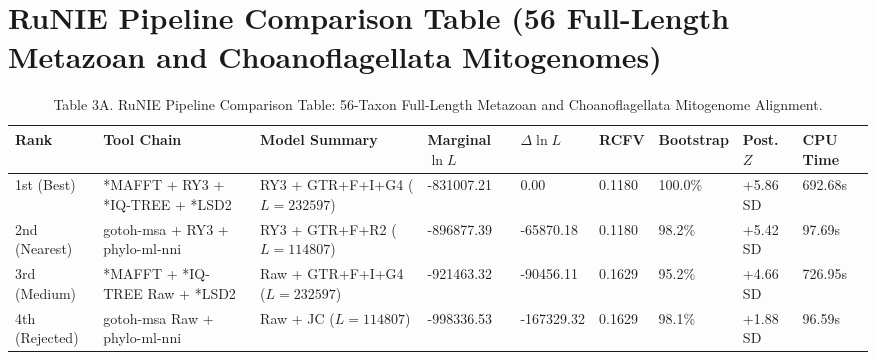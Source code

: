 \documentclass[10pt,letterpaper]{article}
\begin{document}
\section{RuNIE Pipeline Comparison Table (56 Full-Length Metazoan and Choanoflagellata Mitogenomes)}
\begin{table}[htbp]
\centering
\caption{Table 3A. RuNIE Pipeline Comparison Table: 56-Taxon Full-Length Metazoan and Choanoflagellata Mitogenome Alignment.}
\footnotesize
\begin{tabular}{lllllllll}
\toprule
Rank & Tool Chain & Model Summary & Marginal $\ln L$ & $\Delta \ln L$ & RCFV & Bootstrap & Post. $Z$ & CPU Time \\
\midrule
1st (Best) & *MAFFT + RY3 + *IQ-TREE + *LSD2 & RY3 + GTR+F+I+G4 ($L=232597$) & -831007.21 & 0.00 & 0.1180 & 100.0\% & +5.86 SD & 692.68s \\
2nd (Nearest) & gotoh-msa + RY3 + phylo-ml-nni & RY3 + GTR+F+R2 ($L=114807$) & -896877.39 & -65870.18 & 0.1180 & 98.2\% & +5.42 SD & 97.69s \\
3rd (Medium) & *MAFFT + *IQ-TREE Raw + *LSD2 & Raw + GTR+F+I+G4 ($L=232597$) & -921463.32 & -90456.11 & 0.1629 & 95.2\% & +4.66 SD & 726.95s \\
4th (Rejected) & gotoh-msa Raw + phylo-ml-nni & Raw + JC ($L=114807$) & -998336.53 & -167329.32 & 0.1629 & 98.1\% & +1.88 SD & 96.59s \\
\bottomrule
\end{tabular}
\end{table}
\end{document}
